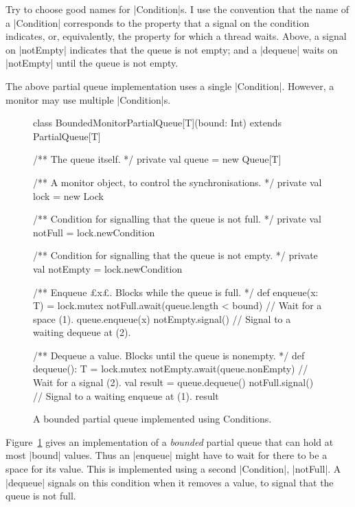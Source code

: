 Try to choose good names for |Condition|s.  I use the convention that the name
of a |Condition| corresponds to the property that a signal on the condition
indicates, or, equivalently, the property for which a thread waits.  Above, a
signal on |notEmpty| indicates that the queue is not empty; and a |dequeue|
waits on |notEmpty| until the queue is not empty.



The above partial queue implementation uses a single |Condition|.  However, a
monitor may use multiple |Condition|s.


\begin{figure}
\begin{scala}
class BoundedMonitorPartialQueue[T](bound: Int) extends PartialQueue[T]{
  /** The queue itself. */
  private val queue = new Queue[T]

  /** A monitor object, to control the synchronisations. */
  private val lock = new Lock

  /** Condition for signalling that the queue is not full. */
  private val notFull = lock.newCondition

  /** Condition for signalling that the queue is not empty. */
  private val notEmpty = lock.newCondition

  /** Enqueue £x£.  Blocks while the queue is full. */
  def enqueue(x: T) = lock.mutex{
    notFull.await(queue.length < bound) // Wait for a space (1).
    queue.enqueue(x)
    notEmpty.signal() // Signal to a waiting dequeue at (2).
  }

  /** Dequeue a value.  Blocks until the queue is nonempty. */
  def dequeue(): T = lock.mutex{
    notEmpty.await(queue.nonEmpty) // Wait for a signal (2).
    val result = queue.dequeue()
    notFull.signal() // Signal to a waiting enqueue at (1).
    result
  }
}
\end{scala}
\caption{A bounded partial queue implemented using {\scalastyle Condition}s.}
\label{fig:BoundedMonitorPartialQueue}
\end{figure}


Figure~\ref{fig:BoundedMonitorPartialQueue} gives an implementation of a
\emph{bounded} partial queue that can hold at most |bound| values.  Thus an
|enqueue| might have to wait for there to be a space for its value.  This is
implemented using a second |Condition|, |notFull|.  A |dequeue| signals on
this condition when it removes a value, to signal that the queue is not full. 

